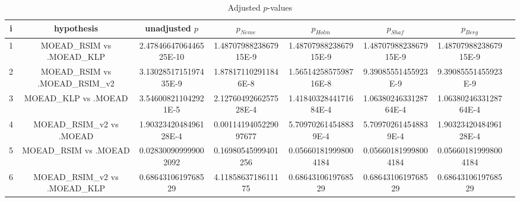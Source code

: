 \documentclass[a4paper,10pt]{article}
\begin{document}
\begin{landscape}
\begin{table}[!htp]
\centering\tiny
\caption{Adjusted $p$-values}
\begin{tabular}{cccccccc}
i&hypothesis&unadjusted $p$&$p_{Neme}$&$p_{Holm}$&$p_{Shaf}$&$p_{Berg}$\\
\hline
1&MOEAD_RSIM vs .MOEAD_KLP&2.4784664706446525E-10&1.4870798823867915E-9&1.4870798823867915E-9&1.4870798823867915E-9&1.4870798823867915E-9\\
2&MOEAD_RSIM vs .MOEAD_RSIM_v2&3.1302851715197435E-9&1.878171102911846E-8&1.5651425857598716E-8&9.39085551455923E-9&9.39085551455923E-9\\
3&MOEAD_KLP vs .MOEAD&3.546008211042921E-5&2.1276049266257528E-4&1.4184032844171684E-4&1.0638024633128764E-4&1.0638024633128764E-4\\
4&MOEAD_RSIM_v2 vs .MOEAD&1.9032342048496128E-4&0.0011419405229097677&5.709702614548839E-4&5.709702614548839E-4&1.9032342048496128E-4\\
5&MOEAD_RSIM vs .MOEAD&0.028300909999002092&0.16980545999401256&0.056601819998004184&0.056601819998004184&0.056601819998004184\\
6&MOEAD_RSIM_v2 vs .MOEAD_KLP&0.6864310619768529&4.1185863718611175&0.6864310619768529&0.6864310619768529&0.6864310619768529\\
\hline
\end{tabular}
\end{table}

\end{landscape}
\end{document}
